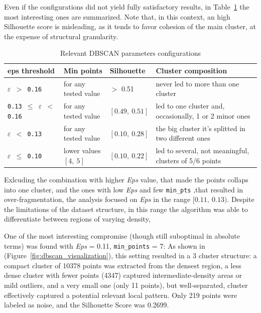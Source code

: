 
Even if the configurations did not yield fully satisfactory results, in Table~\ref{tab:eps} the most interesting ones are summarized.
Note that, in this context, an high Silhouette score is misleading, as it tends to favor cohesion of the main cluster, at the expense of structural granularity.
\begin{table}[h]
\centering
\begin{tabular}{llll}
\toprule
\textbf{eps threshold} & \textbf{Min points} & \textbf{Silhouette} & \textbf{Cluster composition}  \\
\midrule
\texttt{\textbf{$\varepsilon$} $>$ 0.16} & for any tested value &  $>$ 0.51  & never led to more than one cluster \\
\texttt{0.13 $\leq$ \textbf{$\varepsilon$} $<$ 0.16 } & for any tested value &  $[0.49,\ 0.51]$  & led to one cluster and, occasionally, 1 or 2 minor ones\\
\texttt{\textbf{$\varepsilon$} $<$ 0.13 }& for any tested value & $[0.10,\ 0.28]$ & the big cluster it's splitted in two different ones \\
\texttt{\textbf{$\varepsilon$} $\leq$ 0.10} & lower values $[4,\ 5]$& $[0.10,\ 0.22]$  & led to several, not meaningful, clusters of 5/6 points\\

\bottomrule
\end{tabular}
\caption{Relevant DBSCAN parameters configurations}
\label{tab:eps}
\end{table}



Exlcuding the combination with higher \textit{Eps} value, that made the points collaps into one cluster, and the ones with low \textit{Eps} and few \texttt{min\_pts} ,that resulted in over-fragmentation, 
the analysis focused on \textit{Eps} in the range $[0.11,\ 0.13)$.
Despite the limitations of the dataset structure, in this range the algorithm was able to differentiate between regions of varying density, 

One of the most interesting compromise (though still suboptimal in absolute terms) was found with \textit{Eps} = 0.11, \texttt{min\_points} = 7: 
As shown in (Figure~\ref{fig:dbscan_visualization}), this setting resulted in a 3 cluster structure: a compact cluster of 10378 points was extracted from the densest region, a less dense cluster with fewer points (4347) captured intermediate-density areas or mild outliers, 
and a very small one (only 11 points), but well-separated, cluster effectively captured a potential relevant local pattern. Only 219 points were labeled as noise, and the Silhouette Score was 0.2699.\\

